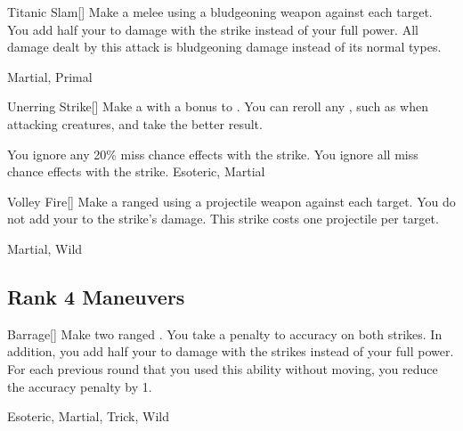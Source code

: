 \lowercase{\hypertarget{maneuver:Titanic Slam}{}}\label{maneuver:Titanic Slam}
\hypertarget{maneuver:Titanic Slam}{}
\begin{freeability}[Rank 3]{Titanic Slam}[]
Make a melee  using a bludgeoning weapon against each target.
You add half your  to damage with the strike instead of your full power.
All damage dealt by this attack is bludgeoning damage instead of its normal types.


 Martial, Primal
\end{freeability}
\vspace{0.25em}



\lowercase{\hypertarget{maneuver:Unerring Strike}{}}\label{maneuver:Unerring Strike}
\hypertarget{maneuver:Unerring Strike}{}
\begin{freeability}[Rank 3]{Unerring Strike}[]
Make a  with a  bonus to .
You can reroll any , such as when attacking  creatures, and take the better result.

\rankline
{} You ignore any 20\% miss chance effects with the strike.
 You ignore all miss chance effects with the strike.
 Esoteric, Martial
\end{freeability}
\vspace{0.25em}



\lowercase{\hypertarget{maneuver:Volley Fire}{}}\label{maneuver:Volley Fire}
\hypertarget{maneuver:Volley Fire}{}
\begin{freeability}[Rank 3]{Volley Fire}[]
Make a ranged  using a projectile weapon against each target.
You do not add your  to the strike's damage.
This strike costs one projectile per target.


 Martial, Wild
\end{freeability}
\vspace{0.25em}


\subsection{Rank 4 Maneuvers}

\lowercase{\hypertarget{maneuver:Barrage}{}}\label{maneuver:Barrage}
\hypertarget{maneuver:Barrage}{}
\begin{freeability}[Rank 4]{Barrage}[]
Make two ranged .
You take a  penalty to accuracy on both strikes.
In addition, you add half your  to damage with the strikes instead of your full power.
For each previous round that you used this ability without moving, you reduce the accuracy penalty by 1.


 Esoteric, Martial, Trick, Wild
\end{freeability}
\vspace{0.25em}




